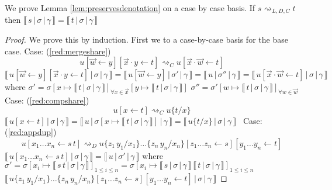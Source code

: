 \documentclass[a4paper,UKenglish,cleveref, autoref]{lipics-v2019}
\newcommand{\app}[2]{#1 \, #2}
\newcommand{\share}[3]{#1 [#2 \leftarrow #3]}
\newcommand{\sub}[3]{#1 \{ #2 / #3 \}}
\newcommand{\readbackwmap}[3]{\llbracket \, #1 \, \vert \, #2 \, \vert \, #3  \, \rrbracket }
\begin{document}
\noindent We prove Lemma \ref{lem:preservesdenotation} on a case by case basis. If $s \rightsquigarrow_{L, D, C} t$ then $\readbackwmap{s}{\sigma}{\gamma} = \readbackwmap{t}{\sigma}{\gamma}$

\begin{proof}
We prove this by induction. First we to a case-by-case basis for the base case.
\newline
\newline
Case: (\ref{red:mergeshare}) 
$$\share{\share{u}{\vec{w}}{y}}{\vec{x} \cdot y}{t} \rightsquigarrow_{C} \share{u}{\vec{x} \cdot \vec{w}}{t} $$
$\readbackwmap{\share{\share{u}{\vec{w}}{y}}{\vec{x} \cdot y}{t}}{\sigma}{\gamma} = \readbackwmap{\share{u}{\vec{w}}{y}}{\sigma'}{\gamma} = \readbackwmap{u}{\sigma''}{\gamma} = \readbackwmap{\share{u}{\vec{x} \cdot \vec{w}}{t}}{\sigma}{\gamma}$
\newline
where
\newline
$\sigma' = \sigma [x \mapsto \readbackwmap{t}{\sigma}{\gamma}]_{\forall x \in \vec{x}} [y \mapsto \readbackwmap{t}{\sigma}{\gamma}]$
\newline
$\sigma'' = \sigma' [w \mapsto \readbackwmap{t}{\sigma}{\gamma}]_{\forall w \in \vec{w}}$
\newline
\newline
\newline
Case: (\ref{red:compshare})
$$\share{u}{x}{t} \rightsquigarrow_{C} \sub{u}{t}{x}$$
$\readbackwmap{\share{u}{x}{t}}{\sigma}{\gamma} = \readbackwmap{u}{\sigma[x \mapsto \readbackwmap{t}{\sigma}{\gamma}]}{\gamma} = \readbackwmap{\sub{u}{t}{x}}{\sigma}{\gamma} $\
\newline
\newline
Case: (\ref{red:appdup})
$$\share{u}{x_{1} \dots x_{n}}{\app{s}{t}} \rightsquigarrow_{D} \share{\share{\sub{\sub{u}{\app{z_{1}}{y_{1}}}{x_{1}}\dots}{\app{z_{n}}{y_{n}}}{x_{n}}}{z_{1} \dots z_{n}}{s}}{y_{1} \dots y_{n}}{t}$$
$\readbackwmap{\share{u}{x_{1} \dots x_{n}}{\app{s}{t}}}{\sigma}{\gamma} = \readbackwmap{u}{\sigma'}{\gamma}$
\newline
where
\newline
$\sigma' = \sigma [ x_{i} \mapsto \readbackwmap{\app{s}{t}}{\sigma}{\gamma}]_{1 \leq i \leq n} = \sigma [x_{i} \mapsto \app{\readbackwmap{s}{\sigma}{\gamma}}{\readbackwmap{t}{\sigma}{\gamma}}]_{1 \leq i \leq n}$
\newline
\newline
$\readbackwmap{ \share{\share{\sub{\sub{u}{\app{z_{1}}{y_{1}}}{x_{1}}\dots}{\app{z_{n}}{y_{n}}}{x_{n}}}{z_{1} \dots z_{n}}{s}}{y_{1} \dots y_{n}}{t}}{\sigma}{\gamma}$

\end{proof}
\end{document}
